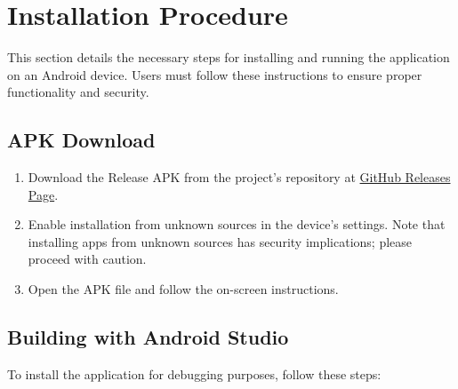 \section{Installation Procedure}
This section details the necessary steps for installing and running the application on an Android device. Users must follow these instructions to ensure proper functionality and security.

\subsection{APK Download}
\begin{enumerate}
    \item Download the Release APK from the project's repository at \href{https://github.com/Mayokun-Sofowora/kavi/releases/download/v1.0.0/app-release.apk}{GitHub Releases Page}.
    \item Enable installation from unknown sources in the device's settings. Note that installing apps from unknown sources has security implications; please proceed with caution.
    \item Open the APK file and follow the on-screen instructions.
\end{enumerate}

\subsection{Building with Android Studio}
To install the application for debugging purposes, follow these steps:

